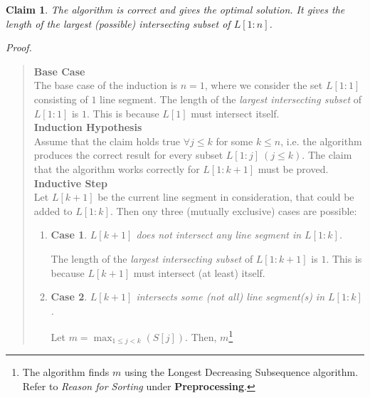 \documentclass[12pt]{report}
\newtheorem{claim}{Claim}
\newtheorem{case}{Case}
\begin{document}
    \begin{claim}
        The algorithm is correct and gives the optimal solution.
        It gives the length of the \textit{largest (possible) intersecting subset} of $L[1:n]$.
    \end{claim}
    \textit{Proof.}
    \begin{quote}
        \textbf{Base Case}
        \vspace*{2.5pt} \\
        The base case of the induction is $n = 1$, where we consider the set $L[1:1]$ consisting of $1$ line segment.
        The length of the \textit{largest intersecting subset} of $L[1:1]$ is $1$.
        This is because $L[1]$ must intersect itself.
        \vspace*{7.5pt} \\
        \textbf{Induction Hypothesis}
        \vspace*{2.5pt} \\
        Assume that the claim holds true $\forall j \le k$ for some $k \le n$, i.e. the algorithm produces the correct
        result for every subset $L[1:j] \ (j \le k)$.
        The claim that the algorithm works correctly for $L[1:k+1]$ must be proved.
        \vspace*{7.5pt} \\
        \textbf{Inductive Step}
        \vspace*{2.5pt} \\
        Let $L[k+1]$ be the current line segment in consideration, that could be added to $L[1:k]$.
        Then ony three (mutually exclusive) cases are possible:
        \begin{enumerate}
            \item
            \begin{case}
                $L[k+1]$ does not intersect any line segment in $L[1:k]$.
            \end{case}
            The length of the \textit{largest intersecting subset} of $L[1:k+1]$ is $1$.
            This is because $L[k+1]$ must intersect (at least) itself.
            \item
            \begin{case}
                $L[k+1]$ intersects some (not all) line segment(s) in $L[1:k]$.
            \end{case}
            Let $m = \max_{1 \le j < k} (S[j])$.
            Then, $m$\footnote{
                The algorithm finds $m$ using the Longest Decreasing Subsequence algorithm.
                Refer to \textit{Reason for Sorting} under \textbf{Preprocessing}.
}
\end{enumerate}
\end{quote}
\end{document}
